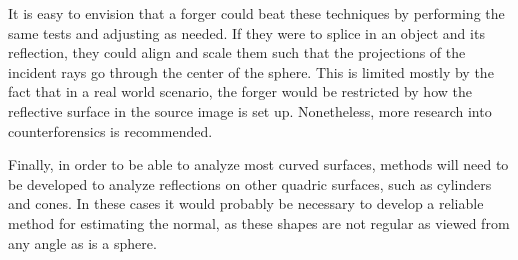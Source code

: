 \documentclass{thesis}
\begin{document}
It is easy to envision that a forger could beat these techniques by performing the same tests and adjusting as needed. If they were to splice in an object and its reflection, they could align and scale them such that the projections of the incident rays go through the center of the sphere. This is limited mostly by the fact that in a real world scenario, the forger would be restricted by how the reflective surface in the source image is set up. Nonetheless, more research into counterforensics is recommended.

Finally, in order to be able to analyze most curved surfaces, methods will need to be developed to analyze reflections on other quadric surfaces, such as cylinders and cones. In these cases it would probably be necessary to develop a reliable method for estimating the normal, as these shapes are not regular as viewed from any angle as is a sphere.


\clearpage


\end{document}
